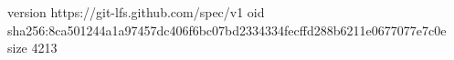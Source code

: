 version https://git-lfs.github.com/spec/v1
oid sha256:8ca501244a1a97457dc406f6bc07bd2334334fecffd288b6211e0677077e7c0e
size 4213
